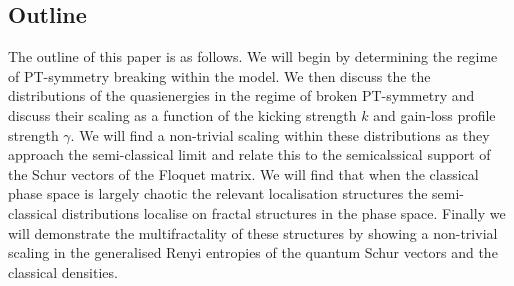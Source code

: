 \documentclass{iopart}
\begin{document}
	\subsection{Outline}
	The outline of this paper is as follows. We will begin by determining the regime of PT-symmetry breaking within the model. We then discuss the the distributions of the quasienergies in the regime of broken PT-symmetry and discuss their scaling as a function of the kicking strength $k$ and gain-loss profile strength $\gamma$. We will find a non-trivial scaling within these distributions as they approach the semi-classical limit and relate this to the semicalssical support of the Schur vectors of the Floquet matrix. We will find that when the classical phase space is largely chaotic the relevant localisation structures the semi-classical distributions localise on fractal structures in the phase space.  Finally we will demonstrate the multifractality of these structures by showing a non-trivial scaling in the generalised Renyi entropies of the quantum Schur vectors and the classical densities. 
\end{document}
